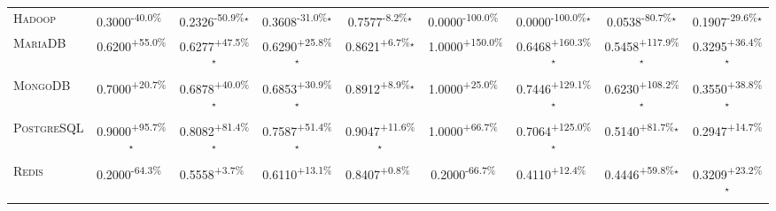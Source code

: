 \begin{table}[htbp]
\begin{tabular}{l|cccc|cccc}
\textsc{Hadoop} & \cellcolor{red!30}0.3000\textsuperscript{-40.0\%}$^{\,\,\,}$ & \cellcolor{red!30}0.2326\textsuperscript{-50.9\%}$^\star$ & \cellcolor{red!30}0.3608\textsuperscript{-31.0\%}$^\star$ & \cellcolor{red!30}0.7577\textsuperscript{-8.2\%}$^\star$ & \cellcolor{red!30}0.0000\textsuperscript{-100.0\%}$^{\,\,\,}$ & \cellcolor{red!30}0.0000\textsuperscript{-100.0\%}$^\star$ & \cellcolor{red!30}0.0538\textsuperscript{-80.7\%}$^\star$ & \cellcolor{red!30}0.1907\textsuperscript{-29.6\%}$^\star$ \\
\textsc{MariaDB} & \cellcolor{green!30}0.6200\textsuperscript{+55.0\%}$^{\,\,\,}$ & \cellcolor{green!30}0.6277\textsuperscript{+47.5\%}$^\star$ & \cellcolor{green!30}0.6290\textsuperscript{+25.8\%}$^\star$ & \cellcolor{green!30}0.8621\textsuperscript{+6.7\%}$^\star$ & \cellcolor{green!30}1.0000\textsuperscript{+150.0\%}$^{\,\,\,}$ & \cellcolor{green!30}0.6468\textsuperscript{+160.3\%}$^\star$ & \cellcolor{green!30}0.5458\textsuperscript{+117.9\%}$^\star$ & \cellcolor{green!30}0.3295\textsuperscript{+36.4\%}$^\star$ \\
\textsc{MongoDB} & \cellcolor{green!30}0.7000\textsuperscript{+20.7\%}$^{\,\,\,}$ & \cellcolor{green!30}0.6878\textsuperscript{+40.0\%}$^\star$ & \cellcolor{green!30}0.6853\textsuperscript{+30.9\%}$^\star$ & \cellcolor{green!30}0.8912\textsuperscript{+8.9\%}$^\star$ & \cellcolor{green!30}1.0000\textsuperscript{+25.0\%}$^{\,\,\,}$ & \cellcolor{green!30}0.7446\textsuperscript{+129.1\%}$^\star$ & \cellcolor{green!30}0.6230\textsuperscript{+108.2\%}$^\star$ & \cellcolor{green!30}0.3550\textsuperscript{+38.8\%}$^\star$ \\
\textsc{PostgreSQL} & \cellcolor{green!30}0.9000\textsuperscript{+95.7\%}$^\star$ & \cellcolor{green!30}0.8082\textsuperscript{+81.4\%}$^\star$ & \cellcolor{green!30}0.7587\textsuperscript{+51.4\%}$^\star$ & \cellcolor{green!30}0.9047\textsuperscript{+11.6\%}$^\star$ & \cellcolor{green!30}1.0000\textsuperscript{+66.7\%}$^{\,\,\,}$ & \cellcolor{green!30}0.7064\textsuperscript{+125.0\%}$^\star$ & \cellcolor{green!30}0.5140\textsuperscript{+81.7\%}$^\star$ & \cellcolor{green!30}0.2947\textsuperscript{+14.7\%}$^{\,\,\,}$ \\
\textsc{Redis} & \cellcolor{red!30}0.2000\textsuperscript{-64.3\%}$^{\,\,\,}$ & \cellcolor{green!30}0.5558\textsuperscript{+3.7\%}$^{\,\,\,}$ & \cellcolor{green!30}0.6110\textsuperscript{+13.1\%}$^{\,\,\,}$ & \cellcolor{green!30}0.8407\textsuperscript{+0.8\%}$^{\,\,\,}$ & \cellcolor{red!30}0.2000\textsuperscript{-66.7\%}$^{\,\,\,}$ & \cellcolor{green!30}0.4110\textsuperscript{+12.4\%}$^{\,\,\,}$ & \cellcolor{green!30}0.4446\textsuperscript{+59.8\%}$^\star$ & \cellcolor{green!30}0.3209\textsuperscript{+23.2\%}$^\star$ \\

\end{tabular}
\end{table}
